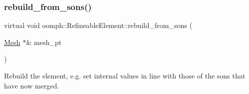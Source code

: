 \subsubsection{\texorpdfstring{rebuild\+\_\+from\+\_\+sons()}{rebuild\_from\_sons()}}
{\footnotesize\ttfamily virtual void oomph\+::\+Refineable\+Element\+::rebuild\+\_\+from\+\_\+sons (\begin{DoxyParamCaption}\item[{\hyperlink{classoomph_1_1Mesh}{Mesh} $\ast$\&}]{mesh\+\_\+pt }\end{DoxyParamCaption})\hspace{0.3cm}{\ttfamily [pure virtual]}}



Rebuild the element, e.\+g. set internal values in line with those of the sons that have now merged. 



